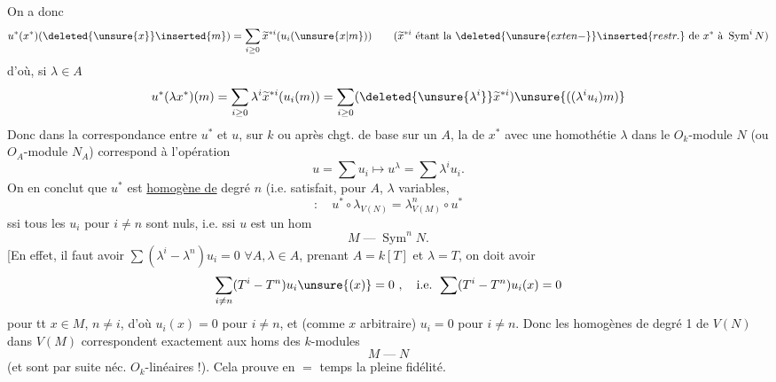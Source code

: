On a donc
\[
u^*(x^*)(\deleted{\unsure{x}}\inserted{m})=
\sum_{i\geq0}\widetilde{x}^{*i}(u_i(\unsure{x|m}))
\qquad(\widetilde{x}^{*i}\text{ étant la }\deleted{\unsure{exten-}}\inserted{restr.}\text{ de }x^*\text{ à }\operatorname{Sym}^iN)
\]
d'où, si $\lambda\in A$
\[
u^*(\lambda x^*)(m)=\sum_{i\geq0}\lambda^i\widetilde{x}^{*i}(u_i(m))
=\sum_{i\geq0}(\deleted{\unsure{\lambda^i}}\widetilde{x}^{*i})\unsure{((\lambda^iu_i)m)}
\]
Donc dans la correspondance entre $u^*$ et $u$, sur $k$ ou après chgt. de base sur un $A$, la   de $x^*$ avec une homothétie  $\lambda$ dans le $O_k$-module $N$ (ou $O_A$-module $N_A$) correspond à l'opération
\[
u=\sum u_i\longmapsto u^\lambda=\sum\lambda^iu_i.
\]
On en conclut que $u^*$ est \uline{homogène de} degré $n$ (i.e. satisfait, pour $A$, $\lambda$ variables,
\[
:\quad u^*\circ\lambda_{V(N)}=\lambda^n_{V(M)}\circ u^*
\]
ssi tous les $u_i$ pour $i\neq n$ sont nuls, i.e. ssi $u$ est un hom
\[
M\mathbin{\text{---}}\operatorname{Sym}^nN.
\]
[En effet, il faut avoir $\sum(\lambda^i-\lambda^n)u_i=0$ $\forall A,\lambda\in A$, prenant $A=k[T]$ et $\lambda=T$, on doit avoir
\[
\sum_{i\neq n}(T^i-T^n)u_i\unsure{(x)}=0\ ,\quad
\text{i.e. }\sum(T^i-T^n)u_i(x)=0
\]
pour tt $x\in M$, $n\neq i$, d'où  $u_i(x)=0$
pour $i\neq n$, et (comme $x$ arbitraire) $u_i=0$ pour $i\neq n$.
Donc les  homogènes de degré 1 de $V(N)$ dans $V(M)$ correspondent exactement aux homs des $k$-modules
\[
M\mathbin{\text{---}}N
\]
(et sont par suite néc. $O_k$-linéaires !). Cela prouve en $=$ temps la pleine fidélité.

